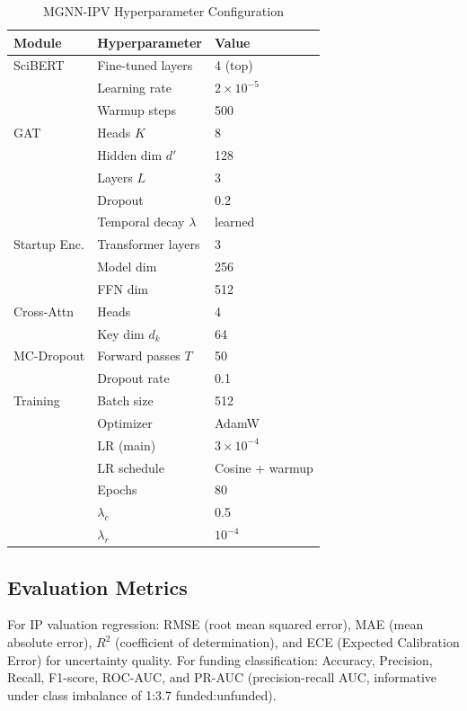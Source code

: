 \documentclass[journal]{IEEEtran}
\begin{document}
\begin{table}[h]
\centering
\caption{MGNN-IPV Hyperparameter Configuration}
\label{tab:hyperparams}
\begin{tabular}{lll}
\toprule
\textbf{Module} & \textbf{Hyperparameter} & \textbf{Value} \\
\midrule
SciBERT & Fine-tuned layers & 4 (top) \\
 & Learning rate & $2 \times 10^{-5}$ \\
 & Warmup steps & 500 \\
GAT & Heads $K$ & 8 \\
 & Hidden dim $d'$ & 128 \\
 & Layers $L$ & 3 \\
 & Dropout & 0.2 \\
 & Temporal decay $\lambda$ & learned \\
Startup Enc. & Transformer layers & 3 \\
 & Model dim & 256 \\
 & FFN dim & 512 \\
Cross-Attn & Heads & 4 \\
 & Key dim $d_k$ & 64 \\
MC-Dropout & Forward passes $T$ & 50 \\
 & Dropout rate & 0.1 \\
Training & Batch size & 512 \\
 & Optimizer & AdamW \\
 & LR (main) & $3 \times 10^{-4}$ \\
 & LR schedule & Cosine + warmup \\
 & Epochs & 80 \\
 & $\lambda_c$ & 0.5 \\
 & $\lambda_r$ & $10^{-4}$ \\
\bottomrule
\end{tabular}
\end{table}

\subsection{Evaluation Metrics}

For IP valuation regression: RMSE (root mean squared error), MAE (mean absolute error), $R^2$ (coefficient of determination), and ECE (Expected Calibration Error) for uncertainty quality. For funding classification: Accuracy, Precision, Recall, F1-score, ROC-AUC, and PR-AUC (precision-recall AUC, informative under class imbalance of 1:3.7 funded:unfunded).
\end{document}
